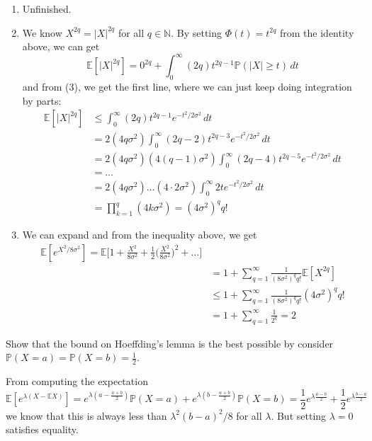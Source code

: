 \documentclass{article}
\theoremstyle{definition}
\theoremstyle{remark}
\theoremstyle{definition}
\begin{document}
\begin{solution}
\begin{enumerate}
      \item Unfinished. 
      
      \item We know $X^{2q} = |X|^{2q}$ for all $q \in \mathbb{N}$. By setting $\Phi(t) = t^{2q}$ from the identity above, we can get 
      \[\mathbb{E}[|X|^{2q}] = 0^{2q} + \int_0^\infty (2q) t^{2q - 1} \mathbb{P}(|X| \geq t) \,dt\]
      and from (3), we get the first line, where we can just keep doing integration by parts: 
      \begin{align*}
          \mathbb{E}[|X|^{2q}] & \leq \int_0^\infty (2q) t^{2q - 1} e^{- t^2 / 2 \sigma^2} \,dt \\
          & = 2 (4q \sigma^2) \int_0^\infty (2q - 2) t^{2q - 3} e^{-t^2 / 2 \sigma^2} \, dt \\
          & = 2 (4q \sigma^2) (4 (q - 1) \sigma^2) \int_0^\infty (2q - 4) t^{2q - 5} e^{-t^2 / 2\sigma^2} \,dt \\
          & = \ldots \\
          & = 2 (4q \sigma^2) \ldots (4 \cdot 2\sigma^2) \int_0^\infty 2t e^{-t^2 / 2 \sigma^2} \,dt \\
          & = \prod_{k=1}^q (4 k \sigma^2) = (4 \sigma^2)^q q! 
      \end{align*}
      
      \item We can expand and from the inequality above, we get 
      \begin{align*}
          \mathbb{E}[e^{X^2 / 8 \sigma^2}] = \mathbb{E} \bigg[ 1 + \frac{X^2}{8 \sigma^2} + \frac{1}{2} \bigg( \frac{X^2}{8 \sigma^2}\bigg)^2 + \ldots \bigg] \\
          & = 1 + \sum_{q = 1}^\infty \frac{1}{(8 \sigma^2)^q q!} \mathbb{E}[X^{2q}] \\
          & \leq 1 + \sum_{q = 1}^\infty \frac{1}{(8 \sigma^2)^q q!} (4 \sigma^2)^q q! \\
          & = 1 + \sum_{q=1}^\infty \frac{1}{2^q} = 2 
      \end{align*}
  \end{enumerate}


  \end{solution}

  \begin{exercise}
  Show that the bound on Hoeffding's lemma is the best possible by consider $\mathbb{P}(X = a) = \mathbb{P}(X = b) = \frac{1}{2}$. 
  \end{exercise}
  \begin{solution}
  From computing the expectation 
  \[\mathbb{E}[ e^{\lambda (X - \mathbb{E} X)}] = e^{\lambda (a - \frac{a + b}{2})} \mathbb{P}(X = a) + e^{\lambda (b - \frac{a + b}{2})} \mathbb{P}(X = b) = \frac{1}{2} e^{ \lambda \frac{a - b}{2}} + \frac{1}{2} e^{\lambda \frac{b - a}{2}}\]
  we know that this is always less than $\lambda^2 (b - a)^2/ 8$ for all $\lambda$. But setting $\lambda = 0$ satisfies equality. 
  \end{solution}
\end{document}
